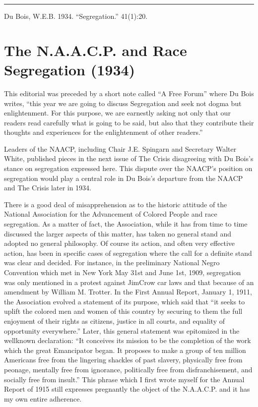 \documentclass[letterpaper,10pt,english]{jupyterBook}
\begin{document}
\bigskip\hrule\bigskip


\sphinxAtStartPar
{} Du Bois, W.E.B. 1934. “Segregation.”  41(1):20.


\section{The N.A.A.C.P. and Race Segregation (1934)}
\label{\detokenize{Volumes/41/02/naacp_and_race_segregation:the-n-a-a-c-p-and-race-segregation-1934}}\label{\detokenize{Volumes/41/02/naacp_and_race_segregation::doc}}
\begin{sphinxShadowBox}
\sphinxstylesidebartitle{}

\sphinxAtStartPar
This editorial was preceded by a short note called “A Free Forum” where Du Bois writes, “this year we are going to discuss Segregation and seek not dogma but enlightenment. For this purpose, we are earnestly asking not only that our readers read carefully what is going to be said, but also that they contribute their thoughts and experiences for the enlightenment of other readers.”

\sphinxAtStartPar
Leaders of the NAACP, including Chair J.E. Spingarn and Secretary Walter White, published pieces in the next issue of The Crisis disagreeing with Du Bois’s stance on segregation expressed here. This dispute over the NAACP’s position on segregation would play a central role in Du Bois’s departure from the NAACP and The Crisis later in 1934.
\end{sphinxShadowBox}

\sphinxAtStartPar
There is a good deal of misapprehension as to the historic attitude of the National Association for the Advancement of Colored People and race segregation. As a matter of fact, the Association, while it has from time to time discussed the larger aspects of this matter, has taken no general stand and adopted no general philosophy. Of course its action, and often very effective action, has been in specific cases of segregation where the call for a definite stand was clear and decided. For instance, in the preliminary National Negro Convention which met in New York May 31st and June 1st, 1909, segregation was only mentioned in a protest against Jim\sphinxhyphen{}Crow car laws and that because of an amendment by William M. Trotter. In the First Annual Report, January 1, 1911, the Association evolved a statement of its purpose, which said that “it seeks to uplift the colored men and women of this country by securing to them the full enjoyment of their rights as citizens, justice in all courts, and equality of opportunity everywhere.” Later, this general statement was epitomized in the well\sphinxhyphen{}known declaration: “It conceives its mission to be the completion of the work which the great Emancipator began. It proposes to make a group of ten million Americans free from the lingering shackles of past slavery, physically free from peonage, mentally free from ignorance, politically free from disfranchisement, and socially free from insult.” This phrase which I first wrote myself for the Annual Report of 1915 still expresses pregnantly the object of the N.A.A.C.P. and it has my own entire adherence.
\end{document}

